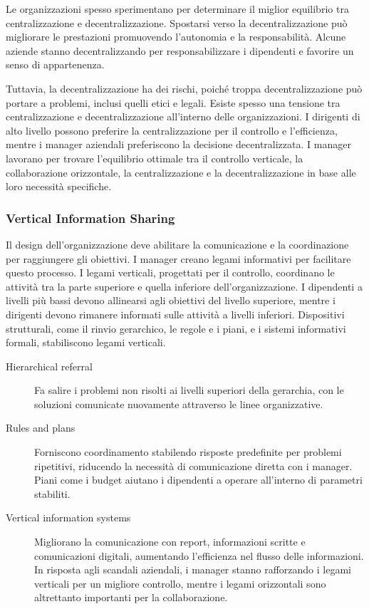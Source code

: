 \documentclass{article}
\begin{document}
Le organizzazioni spesso sperimentano per determinare il miglior equilibrio tra centralizzazione e decentralizzazione. Spostarsi verso la decentralizzazione può migliorare le prestazioni promuovendo l’autonomia e la responsabilità. Alcune aziende stanno decentralizzando per responsabilizzare i dipendenti e favorire un senso di appartenenza.

Tuttavia, la decentralizzazione ha dei rischi, poiché troppa decentralizzazione può portare a problemi, inclusi quelli etici e legali. Esiste spesso una tensione tra centralizzazione e decentralizzazione all’interno delle organizzazioni. I dirigenti di alto livello possono preferire la centralizzazione per il controllo e l’efficienza, mentre i manager aziendali preferiscono la decisione decentralizzata. I manager lavorano per trovare l’equilibrio ottimale tra il controllo verticale, la collaborazione orizzontale, la centralizzazione e la decentralizzazione in base alle loro necessità specifiche.

\subsubsection{Vertical Information Sharing}

Il design dell’organizzazione deve abilitare la comunicazione e la coordinazione per raggiungere gli obiettivi. I manager creano legami informativi per facilitare questo processo. I legami verticali, progettati per il controllo, coordinano le attività tra la parte superiore e quella inferiore dell’organizzazione. I dipendenti a livelli più bassi devono allinearsi agli obiettivi del livello superiore, mentre i dirigenti devono rimanere informati sulle attività a livelli inferiori. Dispositivi strutturali, come il rinvio gerarchico, le regole e i piani, e i sistemi informativi formali, stabiliscono legami verticali.

\begin{description}
    \item[Hierarchical referral] Fa salire i problemi non risolti ai livelli superiori della gerarchia, con le soluzioni comunicate nuovamente attraverso le linee organizzative.
    \item[Rules and plans] Forniscono coordinamento stabilendo risposte predefinite per problemi ripetitivi, riducendo la necessità di comunicazione diretta con i manager. Piani come i budget aiutano i dipendenti a operare all'interno di parametri stabiliti.
    \item[Vertical information systems] Migliorano la comunicazione con report, informazioni scritte e comunicazioni digitali, aumentando l'efficienza nel flusso delle informazioni. In risposta agli scandali aziendali, i manager stanno rafforzando i legami verticali per un migliore controllo, mentre i legami orizzontali sono altrettanto importanti per la collaborazione.
\end{description}
\end{document}

